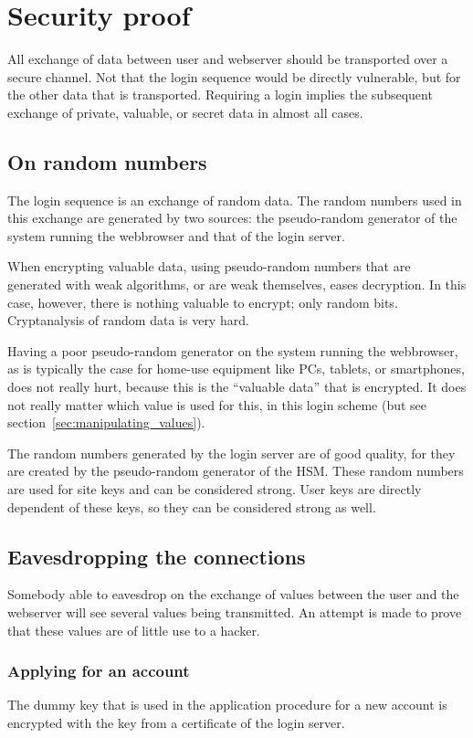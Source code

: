 \section{Security proof}
All exchange of data between user and webserver should be transported over a secure channel.
Not that the login sequence would be directly vulnerable,
but for the other data that is transported.
Requiring a login implies the subsequent exchange of private, valuable, or secret data in almost all cases.
\subsection{On random numbers}
The login sequence is an exchange of random data.
The random numbers used in this exchange are generated by two sources:
the pseudo-random generator of the system running the webbrowser and that of the login server.
\par
When encrypting valuable data,
using pseudo-random numbers that are generated with weak algorithms,
or are weak themselves,
eases decryption.
In this case,
however,
there is nothing valuable to encrypt;
only random bits.
Cryptanalysis of random data is very hard.
\par
Having a poor pseudo-random generator on the system running the webbrowser,
as is typically the case for home-use equipment like PCs,
tablets,
or smartphones,
does not really hurt,
because this is the ``valuable data'' that is encrypted.
It does not really matter which value is used for this,
in this login scheme
(but see section~\ref{sec:manipulating_values}).
\par
The random numbers generated by the login server are of good quality,
for they are created by the pseudo-random generator of the HSM.
These random numbers are used for site keys and can be considered strong.
User keys are directly dependent of these keys,
so they can be considered strong as well.
\subsection{Eavesdropping the connections}
Somebody able to eavesdrop on the exchange of values between the user
and the webserver will see several values being transmitted.
An attempt is made to prove that these values are of little use to a hacker.
\subsubsection{Applying for an account}
The dummy key that is used in the application procedure for a new account is encrypted with the key
from a certificate of the login server.

